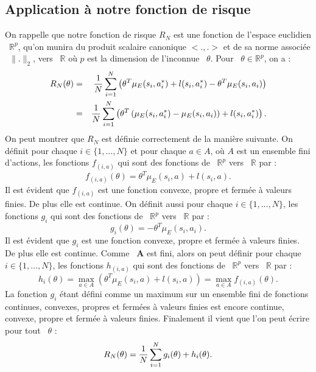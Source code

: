 \documentclass[publibook-draft]{CAp2012}
\newcommand{\A}{\mathbf{A}}
\begin{document}
\subsection{Application à notre fonction de risque}
On rappelle que notre fonction de risque $R_N$ est une fonction de l'espace euclidien ~$\mathbb{R}^p$, qu'on munira du produit scalaire canonique $<.,.>$ et de sa norme associée ~$\|.\|_2$, vers ~$\mathbb{R}$ où $p$ est la dimension de l'inconnue ~$\theta$. Pour ~$\theta\in\mathbb{R}^p$, on a :
\begin{eqnarray}
   R_N(\theta) &=& {1\over N} \sum_{i=1}^N\left(\theta ^T \mu_E(s_i,a^*_i) + l(s_i,a^*_i) - \theta ^T \mu_E(s_i,a_i) \right)\\
   &=& {1\over N} \sum_{i=1}^N\left(\theta^T\left(\mu_E(s_i,a^*_i) - \mu_E(s_i,a_i)\right) + l(s_i,a^*_i)  \right).
\end{eqnarray}
On peut montrer que $R_N$ est définie correctement de la manière suivante.
On définit pour chaque $i\in\{1,\dots,N\}$ et pour chaque $a\in A$, où $A$ est un ensemble fini d'actions, les fonctions $f_{(i,a)}$ qui sont des fonctions de ~$\mathbb{R}^p$ vers ~$\mathbb{R}$ par :
\begin{equation}
f_{(i,a)}({\theta})=\theta ^T \mu_E(s_i,a) + l(s_i,a).
\end{equation}
Il est évident que $f_({i,a})$ est une fonction convexe, propre et fermée à valeurs finies. De plus elle est continue. On définit aussi pour chaque $i\in\{1,\dots,N\}$, les fonctions $g_{i}$ qui sont des fonctions de ~$\mathbb{R}^p$ vers ~$\mathbb{R}$ par :
\begin{equation}
g_{i}({\theta})=-\theta ^T \mu_E(s_i,a_i).
\end{equation}
Il est évident que $g_{i}$ est une fonction convexe, propre et fermée à valeurs finies. De plus elle est continue.
Comme ~$\A$ est fini, alors on peut définir pour chaque $i\in\{1,\dots,N\}$, les fonctions $h_{(i,a)}$ qui sont des fonctions de ~$\mathbb{R}^p$ vers ~$\mathbb{R}$ par :
\begin{equation}
h_{i}({\theta})=\max_{a \in A}(\theta ^T \mu_E(s_i,a) + l(s_i,a))=\max_{a \in A}f_{(i,a)}({\theta}).
\end{equation}
La fonction $g_{i}$ étant défini comme un maximum sur un ensemble fini de fonctions continues, convexes, propres et fermées à valeurs finies est encore continue, convexe, propre et fermée à valeurs finies.
Finalement il vient que l'on peut écrire pour tout ~$\theta$ :
\begin{equation}
R_N(\theta) = {1\over N} \sum_{i=1}^N g_{i}({\theta})+h_{i}({\theta}).
\end{equation}
\end{document}
